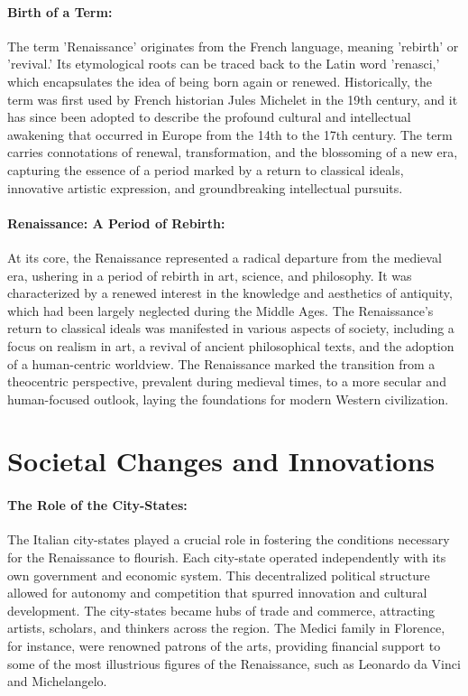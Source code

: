 \documentclass{book}
\begin{document}
\paragraph{Birth of a Term:}
The term 'Renaissance' originates from the French language, meaning 'rebirth' or 'revival.' Its etymological roots can be traced back to the Latin word 'renasci,' which encapsulates the idea of being born again or renewed. Historically, the term was first used by French historian Jules Michelet in the 19th century, and it has since been adopted to describe the profound cultural and intellectual awakening that occurred in Europe from the 14th to the 17th century. The term carries connotations of renewal, transformation, and the blossoming of a new era, capturing the essence of a period marked by a return to classical ideals, innovative artistic expression, and groundbreaking intellectual pursuits.

\paragraph{Renaissance: A Period of Rebirth:}
At its core, the Renaissance represented a radical departure from the medieval era, ushering in a period of rebirth in art, science, and philosophy. It was characterized by a renewed interest in the knowledge and aesthetics of antiquity, which had been largely neglected during the Middle Ages. The Renaissance's return to classical ideals was manifested in various aspects of society, including a focus on realism in art, a revival of ancient philosophical texts, and the adoption of a human-centric worldview. The Renaissance marked the transition from a theocentric perspective, prevalent during medieval times, to a more secular and human-focused outlook, laying the foundations for modern Western civilization.

\section*{Societal Changes and Innovations}

\paragraph{The Role of the City-States:}
The Italian city-states played a crucial role in fostering the conditions necessary for the Renaissance to flourish. Each city-state operated independently with its own government and economic system. This decentralized political structure allowed for autonomy and competition that spurred innovation and cultural development. The city-states became hubs of trade and commerce, attracting artists, scholars, and thinkers across the region. The Medici family in Florence, for instance, were renowned patrons of the arts, providing financial support to some of the most illustrious figures of the Renaissance, such as Leonardo da Vinci and Michelangelo.
\end{document}
